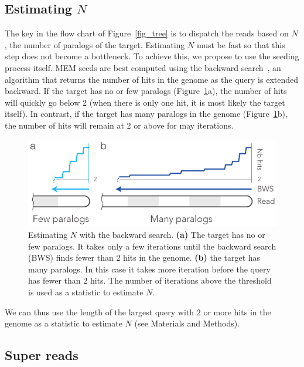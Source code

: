 \documentclass[a4,center,fleqn]{NAR}
\begin{document}
\subsection{Estimating $N$}
\label{sec_N}

The key in the flow chart of Figure~\ref{fig_tree} is to dispatch the
reads based on $N$, the number of paralogs of the target. Estimating $N$
must be fast so that this step does not become a bottleneck. To achieve
this, we propose to use the seeding process itself. MEM seeds are best
computed using the backward search~\cite{ferragina2000opportunistic}, an
algorithm that returns the number of hits in the genome as the query is
extended backward. If the target has no or few paralogs
(Figure~\ref{fig_back}a), the number of hits will quickly go below 2 (when
there is only one hit, it is most likely the target itself). In contrast,
if the target has many paralogs in the genome (Figure~\ref{fig_back}b),
the number of hits will remain at 2 or above for may iterations.

\begin{figure}[t]
\begin{center}
\includegraphics[scale=.84]{pushing_backward.pdf}
\end{center}
\caption{Estimating $N$ with the backward search. \textbf{(a)} The target
has no or few paralogs. It takes only a few iterations until the backward
search (BWS) finds fewer than 2 hits in the genome. \textbf{(b)} the
target has many paralogs. In this case it takes more iteration before the
query has fewer than 2 hits. The number of iterations above the threshold
is used as a statistic to estimate $N$.}
\label{fig_back}
\end{figure}

We can thus use the length of the largest query with 2 or more hits in the
genome as a statistic to estimate $N$ (see Materials and Methods).


\subsection{Super reads}
\label{sec_super}
\end{document}

